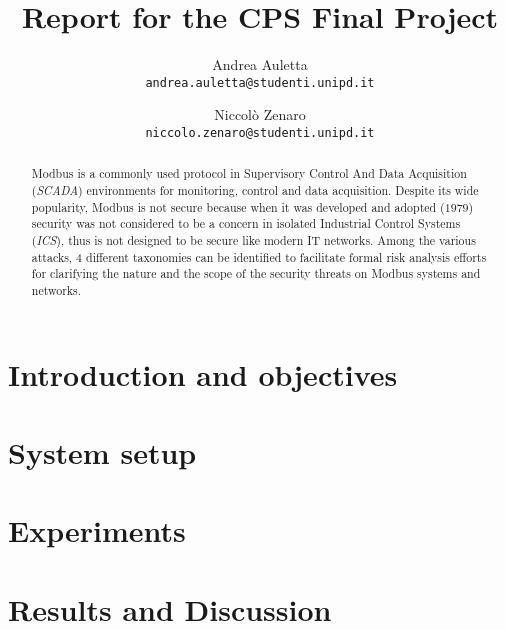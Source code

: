\documentclass[12pt]{article}
\title{Report for the CPS Final Project}
\author{
    Andrea Auletta \\ \texttt{andrea.auletta@studenti.unipd.it} \and
    Niccolò Zenaro \\ \texttt{niccolo.zenaro@studenti.unipd.it}
}
\begin{document}
\maketitle
\newpage
\tableofcontents
\newpage

\begin{abstract}
Modbus is a commonly used protocol in Supervisory Control And Data Acquisition (\textit{SCADA}) environments
for monitoring, control and data acquisition. Despite its wide popularity, Modbus is not secure because when it was developed and adopted ($1979$) security was not considered to be a concern in isolated Industrial Control Systems (\textit{ICS}), thus is not designed to be secure like modern IT networks.
Among the various attacks, 4 different taxonomies can be identified to facilitate formal risk analysis efforts for clarifying the nature and the scope of the security threats on Modbus systems and networks.
\end{abstract}

\section{Introduction and objectives}
\section{System setup}
\section{Experiments}
\section{Results and Discussion}
\printbibliography 
\end{document}
